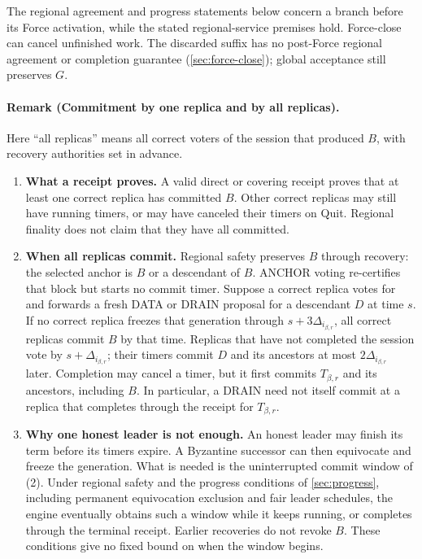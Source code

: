 \documentclass[11pt,a4paper]{article}
\begin{document}
The regional agreement and progress statements below concern a branch
before its Force activation, while the stated regional-service premises
hold. Force-close can cancel unfinished work. The discarded suffix has
no post-Force regional agreement or completion guarantee
(\cref{sec:force-close}); global acceptance still preserves $G$.

\paragraph{Remark (Commitment by one replica and by all replicas).}
Here ``all replicas'' means all correct voters of the session that
produced $B$, with recovery authorities set in advance.
\begin{enumerate}[label=(\arabic*),itemsep=4pt]
\item \textbf{What a receipt proves.} A valid direct or covering receipt
proves that at least one correct replica has committed $B$. Other correct
replicas may still have running timers, or may have canceled their timers
on Quit. Regional finality does not claim that they have all committed.

\item \textbf{When all replicas commit.} Regional safety preserves $B$
through recovery: the selected anchor is $B$ or a descendant of $B$.
ANCHOR voting re-certifies that block but starts no commit timer.
Suppose a correct replica votes for and forwards a fresh DATA or DRAIN
proposal for a descendant $D$ at time $s$. If no correct replica freezes
that generation through $s+3\Delta_{i_{\beta,r}}$, all correct replicas
commit $B$ by that time. Replicas that have not completed the session
vote by $s+\Delta_{i_{\beta,r}}$; their timers commit $D$ and its
ancestors at most $2\Delta_{i_{\beta,r}}$ later. Completion may cancel a
timer, but it first commits $T_{\beta,r}$ and its ancestors, including
$B$. In particular, a DRAIN need not itself commit at a replica that
completes through the receipt for $T_{\beta,r}$.

\item \textbf{Why one honest leader is not enough.} An honest leader may
finish its term before its timers expire. A Byzantine successor can then
equivocate and freeze the generation. What is needed is the uninterrupted
commit window of (2). Under regional safety and the progress conditions
of \cref{sec:progress}, including permanent equivocation exclusion and
fair leader schedules, the engine eventually obtains such a window while
it keeps running, or completes through the terminal receipt. Earlier
recoveries do not revoke $B$. These conditions give no fixed bound on
when the window begins.


\end{enumerate}
\end{document}

